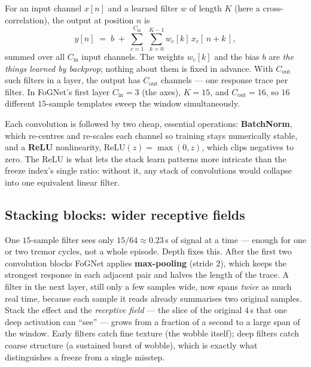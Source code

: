 \begin{mathsbox}
For an input channel $x[n]$ and a learned filter $w$ of length $K$ (here a
 cross-correlation), the output at position $n$ is
\begin{equation}
  y[n] \;=\; b \;+\; \sum_{c=1}^{C_{\text{in}}}\;\sum_{k=0}^{K-1}
           w_{c}[k]\, x_{c}[\,n+k\,],
  \label{eq:conv}
\end{equation}
summed over all $C_{\text{in}}$ input channels. The weights $w_c[k]$ and the bias $b$
are \emph{the things learned by backprop}; nothing about them is fixed in advance.
With $C_{\text{out}}$ such filters in a layer, the output has $C_{\text{out}}$
channels --- one response trace per filter. In FoGNet's first layer $C_{\text{in}}=3$
(the axes), $K=15$, and $C_{\text{out}}=16$, so $16$ different $15$-sample templates
sweep the window simultaneously.
\end{mathsbox}

Each convolution is followed by two cheap, essential operations:
\textbf{BatchNorm}, which re-centres and re-scales each channel so training stays
numerically stable, and a \textbf{ReLU} nonlinearity, $\mathrm{ReLU}(z)=\max(0,z)$,
which clips negatives to zero. The ReLU is what lets the stack learn patterns more
intricate than the freeze index's single ratio: without it, any stack of convolutions
would collapse into one equivalent linear filter.

\subsection{Stacking blocks: wider receptive fields}

One $15$-sample filter sees only $15/64 \approx 0.23$\,\unit{\second} of signal at a
time --- enough for one or two tremor cycles, not a whole episode. Depth fixes this.
After the first two convolution blocks FoGNet applies \textbf{max-pooling} (stride
$2$), which keeps the strongest response in each adjacent pair and halves the length
of the trace. A filter in the next layer, still only a few samples wide, now spans
\emph{twice} as much real time, because each sample it reads already summarises two
original samples. Stack the effect and the \emph{receptive field} --- the slice of the
original $4$\,\unit{\second} that one deep activation can ``see'' --- grows from a
fraction of a second to a large span of the window. Early filters catch fine
texture (the wobble itself); deep filters catch coarse structure (a sustained burst
of wobble), which is exactly what distinguishes a freeze from a single misstep.

